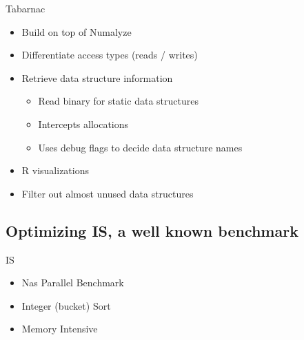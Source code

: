 \documentclass[xcolor={usenames,dvipsnames},hyperref={pdfusetitle}]{beamer}
\begin{document}
\begin{frame}{Tabarnac}
    \begin{alertblock}{}
        \begin{itemize}
            \item Build on top of Numalyze
            \item Differentiate access types (reads / writes)
            \item Retrieve data structure information
                \begin{itemize}
                    \item Read binary for static data structures
                    \item Intercepts allocations
                    \item Uses debug flags to decide data structure names
                \end{itemize}
            \item R visualizations
            \item Filter out almost unused data structures
        \end{itemize}
    \end{alertblock}
\end{frame}

\subsection{Optimizing IS, a well known benchmark}

\begin{frame}{IS}
    \begin{itemize}
        \item Nas Parallel Benchmark~\cite{Jin99NPBOpenMP}
        \item Integer (bucket) Sort
        \item Memory Intensive
    \end{itemize}
\end{frame}
\end{document}
